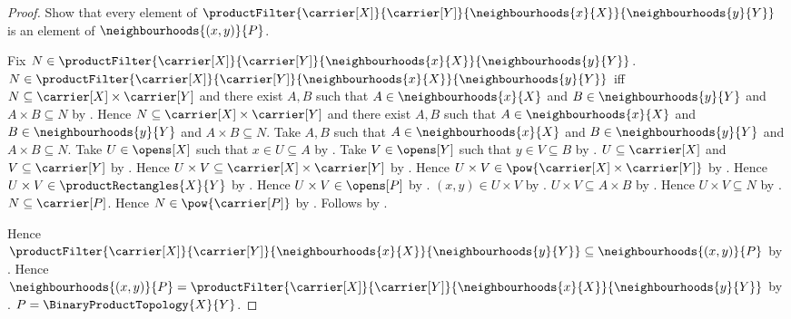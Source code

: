 \begin{proof}
    Show that every element of
        $\productFilter{\carrier[X]}{\carrier[Y]}{
            \neighbourhoods{x}{X}}{\neighbourhoods{y}{Y}}$ is an
        element of $\neighbourhoods{(x,y)}{P}$.
    \begin{subproof}
        Fix $N\in\productFilter{\carrier[X]}{\carrier[Y]}{
            \neighbourhoods{x}{X}}{\neighbourhoods{y}{Y}}$.
        $N\in\productFilter{\carrier[X]}{\carrier[Y]}{
            \neighbourhoods{x}{X}}{\neighbourhoods{y}{Y}}$ iff
            $N\subseteq\carrier[X]\times\carrier[Y]$ and there
            exist $A,B$ such that
                $A\in\neighbourhoods{x}{X}$ and
                $B\in\neighbourhoods{y}{Y}$ and
                $A\times B\subseteq N$ by .
        Hence $N\subseteq\carrier[X]\times\carrier[Y]$ and there
            exist $A,B$ such that
                $A\in\neighbourhoods{x}{X}$ and
                $B\in\neighbourhoods{y}{Y}$ and
                $A\times B\subseteq N$.
        Take $A,B$ such that $A\in\neighbourhoods{x}{X}$ and
            $B\in\neighbourhoods{y}{Y}$ and $A\times B\subseteq N$.
        Take $U\in\opens[X]$ such that $x\in U\subseteq A$ by
            .
        Take $V\in\opens[Y]$ such that $y\in V\subseteq B$ by
            .
        $U\subseteq\carrier[X]$ and $V\subseteq\carrier[Y]$ by
            .
        Hence $U\times V\subseteq\carrier[X]\times\carrier[Y]$ by
            .
        Hence $U\times V\in\pow{\carrier[X]\times\carrier[Y]}$ by
            .
        Hence $U\times V\in\productRectangles{X}{Y}$ by
            .
        Hence $U\times V\in\opens[P]$ by .
        $(x,y)\in U\times V$ by .
        $U\times V\subseteq A\times B$ by .
        Hence $U\times V\subseteq N$ by .
        $N\subseteq\carrier[P]$.
        Hence $N\in\pow{\carrier[P]}$ by .
        Follows by .
    \end{subproof}
    Hence $\productFilter{\carrier[X]}{\carrier[Y]}{
        \neighbourhoods{x}{X}}{\neighbourhoods{y}{Y}}
        \subseteq\neighbourhoods{(x,y)}{P}$ by .
    Hence $\neighbourhoods{(x,y)}{P}
        =\productFilter{\carrier[X]}{\carrier[Y]}{
            \neighbourhoods{x}{X}}{\neighbourhoods{y}{Y}}$ by
        .
    $P=\BinaryProductTopology{X}{Y}$.
\end{proof}
